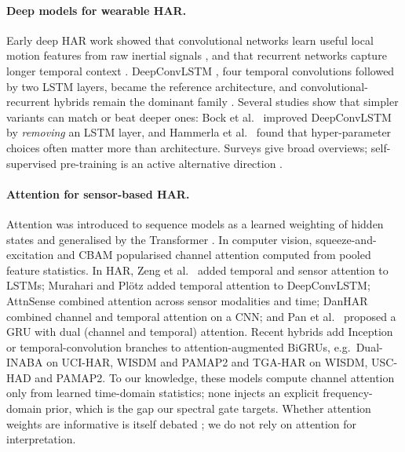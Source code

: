 \documentclass[11pt,a4paper]{article}
\begin{document}
\paragraph{Deep models for wearable HAR.}
Early deep HAR work showed that convolutional networks learn useful local motion features from raw inertial signals \cite{jiang2015human,ronao2016human}, and that recurrent networks capture longer temporal context \cite{hammerla2016deep,guan2017ensembles}. DeepConvLSTM \cite{ordonez2016deep}, four temporal convolutions followed by two LSTM layers, became the reference architecture, and convolutional-recurrent hybrids remain the dominant family \cite{xia2020lstm,mutegeki2020cnn}. Several studies show that simpler variants can match or beat deeper ones: Bock et al.\ \cite{bock2021improving} improved DeepConvLSTM by \emph{removing} an LSTM layer, and Hammerla et al.\ \cite{hammerla2016deep} found that hyper-parameter choices often matter more than architecture. Surveys \cite{wang2019deep,chen2021deep,haresamudram2024past} give broad overviews; self-supervised pre-training is an active alternative direction \cite{tang2021selfhar,haresamudram2022assessing}.

\paragraph{Attention for sensor-based HAR.}
Attention was introduced to sequence models as a learned weighting of hidden states \cite{bahdanau2015neural} and generalised by the Transformer \cite{vaswani2017attention}. In computer vision, squeeze-and-excitation \cite{hu2018squeeze} and CBAM \cite{woo2018cbam} popularised channel attention computed from pooled feature statistics. In HAR, Zeng et al.\ \cite{zeng2018understanding} added temporal and sensor attention to LSTMs; Murahari and Pl\"otz \cite{murahari2018attention} added temporal attention to DeepConvLSTM; AttnSense \cite{ma2019attnsense} combined attention across sensor modalities and time; DanHAR \cite{gao2021danhar} combined channel and temporal attention on a CNN; and Pan et al.\ \cite{pan2022gru} proposed a GRU with dual (channel and temporal) attention. Recent hybrids add Inception or temporal-convolution branches to attention-augmented BiGRUs, e.g.\ Dual-INABA \cite{zhang2025dualinaba} on UCI-HAR, WISDM and PAMAP2 and TGA-HAR \cite{he2025tgahar} on WISDM, USC-HAD and PAMAP2. To our knowledge, these models compute channel attention only from learned time-domain statistics; none injects an explicit frequency-domain prior, which is the gap our spectral gate targets. Whether attention weights are informative is itself debated \cite{jain2019attention,serrano2019attention}; we do not rely on attention for interpretation.
\end{document}
